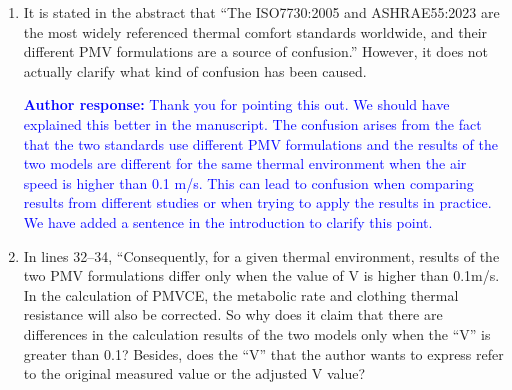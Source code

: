 \documentclass[a4paper, 10pt]{letter}
\newcommand{\response}[1]{\textcolor{blue}{\textbf{Author response:} #1}}
\begin{document}
\begin{letter}
\begin{enumerate}
            \response{This manuscript aims to determine and compare the accuracy of the PMV models implemented in the ISO 7730:2005 and ASHRAE 55:2023 standards.
            We did this by comparing the results of the PMV model with the thermal sensation votes collected in the ASHRAE Global Thermal Comfort Database II v2.1.
            In addition to comparing the accuracy of the two PMV models, we also discussed in the paper that the PMV model is inappropriately used by some authors to predict thermal sensation of individuals outside its range of applicability.
            As a consequence, we recommend limiting the applicability of the PMV model to the range specified in the Table 2 of the manuscript.
            }

            \item It is stated in the abstract that ``The ISO7730:2005 and ASHRAE55:2023 are the most widely referenced thermal comfort standards worldwide, and their different PMV formulations are a source of confusion.''
            However, it does not actually clarify what kind of confusion has been caused.

            \response{Thank you for pointing this out.
            We should have explained this better in the manuscript.
            The confusion arises from the fact that the two standards use different PMV formulations and the results of the two models are different for the same thermal environment when the air speed is higher than 0.1 m/s.
            This can lead to confusion when comparing results from different studies or when trying to apply the results in practice.
            We have added a sentence in the introduction to clarify this point.
            }

            \item In lines 32--34, ``Consequently, for a given thermal environment, results of the two PMV formulations differ only when the value of V is higher than 0.1m/s.
            In the calculation of PMVCE, the metabolic rate and clothing thermal resistance will also be corrected.
            So why does it claim that there are differences in the calculation results of the two models only when the ``V'' is greater than 0.1?
            Besides, does the ``V'' that the author wants to express refer to the original measured value or the adjusted V value?


\end{enumerate}
\end{letter}
\end{document}
